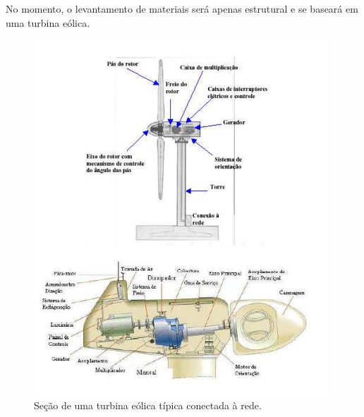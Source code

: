 No momento, o levantamento de materiais será apenas estrutural e se baseará em uma turbina eólica.

\begin{figure}[!htbp]
\centering
\includegraphics[scale=0.80]{editaveis/figuras/turbina}
\caption[Seção de uma turbina eólica]{Seção de uma turbina eólica típica conectada à rede.\footnotemark}
\FloatBarrier
\label{secao_turbina_eolica}
\end{figure}

